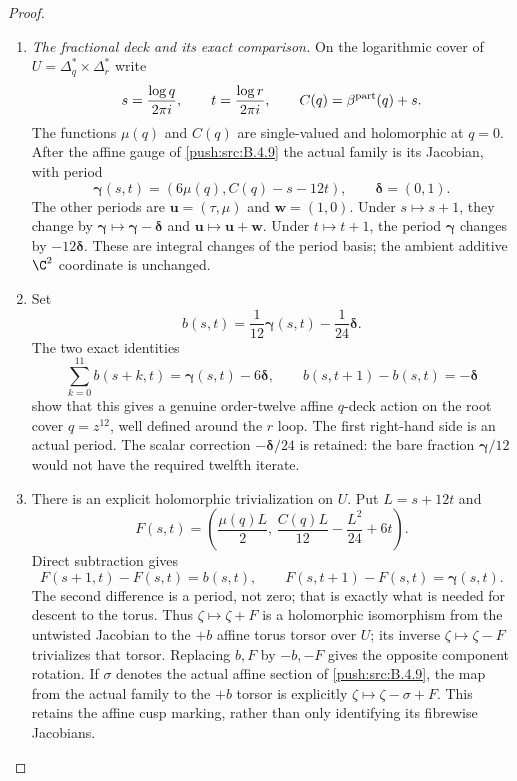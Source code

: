 \begin{proof}
\begin{enumerate}[label=\arabic*.,leftmargin=*]
\item \emph{The fractional deck and its exact comparison.}
On the logarithmic cover of
$U=\Delta_q^*\times\Delta_r^*$ write
\[
 s=\frac{\log q}{2\pi i},\qquad
 t=\frac{\log r}{2\pi i},\qquad
 C(q)=\beta^{\rm part}(q)+s.
\]
The functions $\mu(q)$ and $C(q)$ are single-valued
and holomorphic at $q=0$. After the affine gauge of
\ref{push:src:B.4.9} the actual family is its Jacobian, with period
\[
 \boldsymbol\gamma(s,t)
       =(6\mu(q),C(q)-s-12t),\qquad
 \boldsymbol\delta=(0,1).
 \tag{B.4.18.1}
\]
The other periods are
$\mathbf u=(\tau,\mu)$ and $\mathbf w=(1,0)$.
Under $s\mapsto s+1$, they change by
$\boldsymbol\gamma\mapsto\boldsymbol\gamma-
\boldsymbol\delta$ and $\mathbf u\mapsto\mathbf u+\mathbf w$.
Under $t\mapsto t+1$, the period $\boldsymbol\gamma$
changes by $-12\boldsymbol\delta$.
These are integral changes of the period basis; the
ambient additive $\C^2$ coordinate is unchanged.

\item Set
\[
 b(s,t)=\frac1{12}\boldsymbol\gamma(s,t)
                         -\frac1{24}\boldsymbol\delta.
\]
The two exact identities
\[
 \sum_{k=0}^{11}b(s+k,t)
       =\boldsymbol\gamma(s,t)-6\boldsymbol\delta,
 \qquad
 b(s,t+1)-b(s,t)=-\boldsymbol\delta
 \tag{B.4.18.2}
\]
show that this gives a genuine order-twelve affine
$q$-deck action on the root cover $q=z^{12}$,
well defined around the $r$ loop. The first right-hand
side is an actual period. The scalar correction
$-\boldsymbol\delta/24$ is retained: the bare fraction
$\boldsymbol\gamma/12$ would not have the required
twelfth iterate.

\item There is an explicit holomorphic trivialization on $U$.
Put $L=s+12t$ and
\[
 F(s,t)=
 \left(\frac{\mu(q)L}{2},\,
       \frac{C(q)L}{12}-\frac{L^2}{24}+6t\right).
 \tag{B.4.18.3}
\]
Direct subtraction gives
\[
 F(s+1,t)-F(s,t)=b(s,t),\qquad
 F(s,t+1)-F(s,t)=\boldsymbol\gamma(s,t).
 \tag{B.4.18.4}
\]
The second difference is a period, not zero; that is
exactly what is needed for descent to the torus.
Thus $\zeta\mapsto\zeta+F$ is a holomorphic
isomorphism from the untwisted Jacobian to the
$+b$ affine torus torsor over $U$; its inverse
$\zeta\mapsto\zeta-F$ trivializes that torsor.
Replacing $b,F$ by $-b,-F$ gives the opposite
component rotation. If $\sigma$ denotes the actual
affine section of \ref{push:src:B.4.9}, the map from the actual
family to the $+b$ torsor is explicitly
$\zeta\mapsto\zeta-\sigma+F$.
This retains the affine cusp marking, rather
than only identifying its fibrewise Jacobians.


\end{enumerate}
\end{proof}
